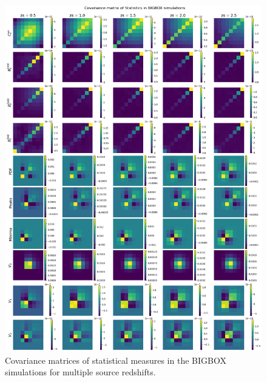 \begin{figure}[p]
    \centering
    \includegraphics[width=\textwidth]{figures/results/cov_bigbox.png}
    \caption[Covariance Matrices of Statistical Measures in BIGBOX Simulations]{Covariance matrices of statistical measures in the BIGBOX simulations for multiple source redshifts.}
    \label{fig:cov_bigbox}
\end{figure}

